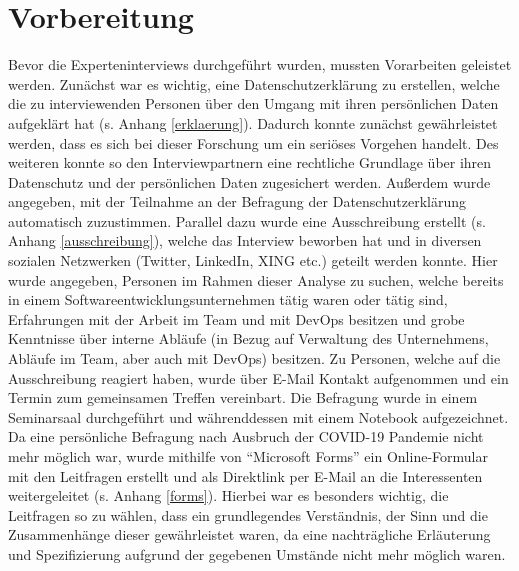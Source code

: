 \section{Vorbereitung}
Bevor die Experteninterviews durchgeführt wurden, mussten Vorarbeiten geleistet werden. Zunächst war es wichtig, eine Datenschutzerklärung zu erstellen, welche die zu interviewenden Personen über den Umgang mit
ihren persönlichen Daten aufgeklärt hat (s. Anhang \ref{erklaerung}). Dadurch konnte zunächst gewährleistet werden, dass es sich bei dieser Forschung um ein seriöses Vorgehen handelt. Des weiteren konnte so den Interviewpartnern eine rechtliche
Grundlage über ihren Datenschutz und der persönlichen Daten zugesichert werden. Außerdem wurde angegeben, mit der Teilnahme an der Befragung der Datenschutzerklärung automatisch zuzustimmen. \newline 
Parallel dazu wurde eine Ausschreibung erstellt (s. Anhang \ref{ausschreibung}), welche das Interview beworben hat und in diversen sozialen Netzwerken (Twitter, LinkedIn, XING etc.) geteilt werden konnte. Hier wurde angegeben, Personen im Rahmen dieser 
Analyse zu suchen, welche bereits in einem Softwareentwicklungsunternehmen tätig waren oder tätig sind, Erfahrungen mit der Arbeit im Team und mit DevOps besitzen und grobe Kenntnisse über interne Abläufe (in Bezug auf 
Verwaltung des Unternehmens, Abläufe im Team, aber auch mit DevOps) besitzen. \newline \newline
Zu Personen, welche auf die Ausschreibung reagiert haben, wurde über E-Mail Kontakt aufgenommen und ein Termin zum gemeinsamen Treffen vereinbart. Die Befragung wurde in einem Seminarsaal durchgeführt und währenddessen mit
einem Notebook aufgezeichnet. Da eine persönliche Befragung nach Ausbruch der COVID-19 Pandemie nicht mehr möglich war, wurde mithilfe von \enquote{Microsoft Forms} ein Online-Formular mit den Leitfragen erstellt und 
als Direktlink per E-Mail an die Interessenten weitergeleitet (s. Anhang \ref{forms}). Hierbei war es besonders wichtig, die Leitfragen so zu wählen, dass ein grundlegendes Verständnis, der Sinn und die Zusammenhänge dieser gewährleistet waren, 
da eine nachträgliche Erläuterung und Spezifizierung aufgrund der gegebenen Umstände nicht mehr möglich waren.

